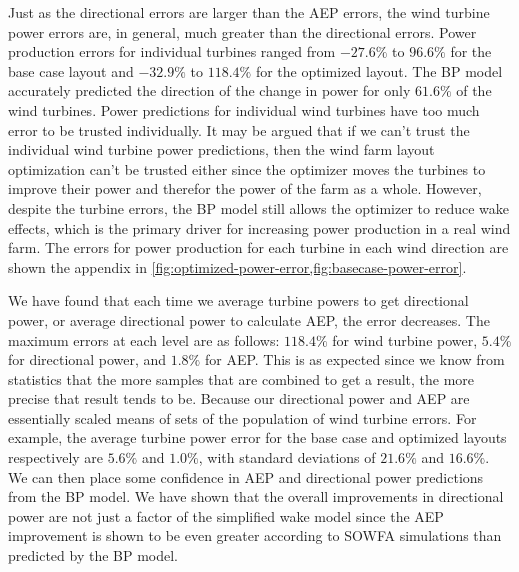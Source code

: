 \documentclass[conf]{new-aiaa}
\begin{document}
Just as the directional errors are larger than the AEP errors, the wind turbine power errors are, in general, much greater than the directional errors. Power production errors for individual turbines ranged from $-27.6\%$ to $96.6\%$ for the base case layout and $-32.9\%$ to $118.4\%$ for the optimized layout. The BP model accurately predicted the direction of the change in power for only $61.6\%$ of the wind turbines. Power predictions for individual wind turbines have too much error to be trusted individually. It may be argued that if we can't trust the individual wind turbine power predictions, then the wind farm layout optimization can't be trusted either since the optimizer moves the turbines to improve their power and therefor the power of the farm as a whole. However, despite the turbine errors, the BP model still allows the optimizer to reduce wake effects, which is the primary driver for increasing power production in a real wind farm. The errors for power production for each turbine in each wind direction are shown the appendix in \cref{fig:optimized-power-error,fig:basecase-power-error}.

We have found that each time we average turbine powers to get directional power, or average directional power to calculate AEP, the error decreases. The maximum errors at each level are as follows: $118.4\%$ for wind turbine power, $5.4\%$ for directional power, and $1.8\%$ for AEP. This is as expected since we know from statistics that the more samples that are combined to get a result, the more precise that result tends to be. Because our directional power and AEP are essentially scaled means of sets of the population of wind turbine errors. For example, the average turbine power error for the base case and optimized layouts respectively are $5.6\%$ and $1.0\%$, with standard deviations of $21.6\%$ and $16.6\%$. We can then place some confidence in AEP and directional power predictions from the BP model. We have shown that the overall improvements in directional power are not just a factor of the simplified wake model since the AEP improvement is shown to be even greater according to SOWFA simulations than predicted by the BP model.
\end{document}
